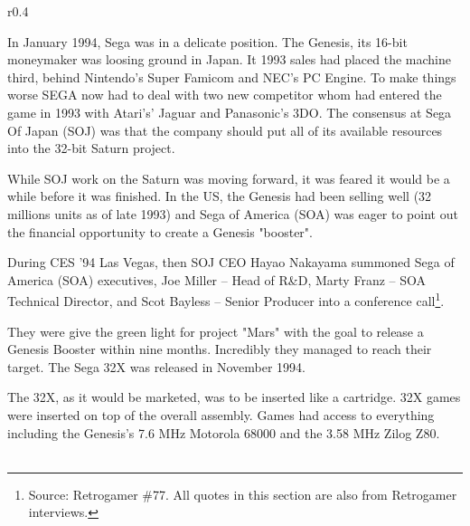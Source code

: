 \begin{wrapfigure}[4]{r}{0.4\textwidth}{
\centering {}}
\end{wrapfigure}
In January 1994, Sega was in a delicate position. The Genesis, its 16-bit moneymaker was loosing ground in Japan. It  1993 sales had placed the machine third, behind Nintendo's Super Famicom and NEC's PC Engine. To make things worse SEGA now had to deal with two new competitor whom had entered the game in 1993 with Atari's' Jaguar and Panasonic's 3DO. The consensus at Sega Of Japan (SOJ) was that the company should put all of its available resources into the 32-bit Saturn project.\\
\par
While SOJ work on the Saturn was moving forward, it was feared it would be a while before it was finished. In the US, the Genesis had been selling well (32 millions units as of late 1993) and Sega of America (SOA) was eager to point out the financial opportunity to create a Genesis "booster".\\
\par
During CES '94 Las Vegas, then SOJ CEO Hayao Nakayama summoned Sega of America (SOA) executives, Joe Miller -- Head of R\&D, Marty Franz -- SOA Technical Director, and Scot Bayless -- Senior Producer into a conference call\footnote{Source: Retrogamer \#77. All quotes in this section are also from Retrogamer interviews.}.\\
\par 
They were give the green light for project "Mars" with the goal to release a Genesis Booster within nine months. Incredibly they managed to reach their target. The Sega 32X was released in November 1994.\\
\par
{}%
\par
The 32X, as it would be marketed, was to be inserted like a cartridge. 32X games were inserted on top of the overall assembly. Games had access to everything including the Genesis's 7.6 MHz Motorola 68000 and the 3.58 MHz Zilog Z80.\\

\\
\par

